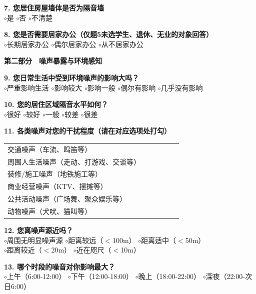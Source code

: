 \begin{appendices}
\textbf{7. 您居住房屋墙体是否为隔音墙}\\
$\circ$是 \quad $\circ$否 \quad $\circ$不清楚

\textbf{8. 您是否需要居家办公（仅题5未选学生、退休、无业的对象回答）}\\
$\circ$长期居家办公 \quad $\circ$偶尔居家办公 \quad $\circ$从不居家办公

\begin{center}
\textbf{第二部分　噪声暴露与环境感知}
\end{center}

\textbf{9. 您日常生活中受到环境噪声的影响大吗？}\\
$\circ$严重影响生活 \quad $\circ$影响较大 \quad $\circ$影响一般 \quad $\circ$偶尔有影响 \quad $\circ$几乎没有影响

\textbf{10. 您的居住区域隔音水平如何？}\\
$\circ$很好 \quad $\circ$较好 \quad $\circ$一般 \quad $\circ$较差 \quad $\circ$很差

\textbf{11. 各类噪声对您的干扰程度（请在对应选项处打勾）}

\begin{table}[H]
\centering
{}
\begin{tabular}{|M{5.2cm}|M{1.6cm}|M{1.6cm}|M{1.6cm}|M{1.6cm}|M{1.6cm}|}
\hline
{}
 &  &  &  &  &  \\
\hline
交通噪声（车流、鸣笛等） & & & & & \\
\hline
周围人生活噪声（走动、打游戏、交谈等） & & & & & \\
\hline
装修/施工噪声（地铁施工等） & & & & & \\
\hline
商业经营噪声（KTV、摆摊等） & & & & & \\
\hline
公共活动噪声（广场舞、聚众娱乐等） & & & & & \\
\hline
动物噪声（犬吠、猫叫等） & & & & & \\
\hline
\end{tabular}
\end{table}

\textbf{12. 您离噪声源近吗？}\\
$\circ$周围无明显噪声源 \quad $\circ$距离较远（$<$100m） \quad $\circ$距离适中（$<$50m）\\
$\circ$距离较近（$<$20m） \quad $\circ$近在咫尺（$<$10m）

\textbf{13. 哪个时段的噪音对你影响最大？}\\
$\circ$上午（6:00-12:00） \quad $\circ$下午（12:00-18:00） \quad $\circ$晚上（18:00-22:00） \quad $\circ$深夜（22:00-次日6:00）


\end{appendices}
